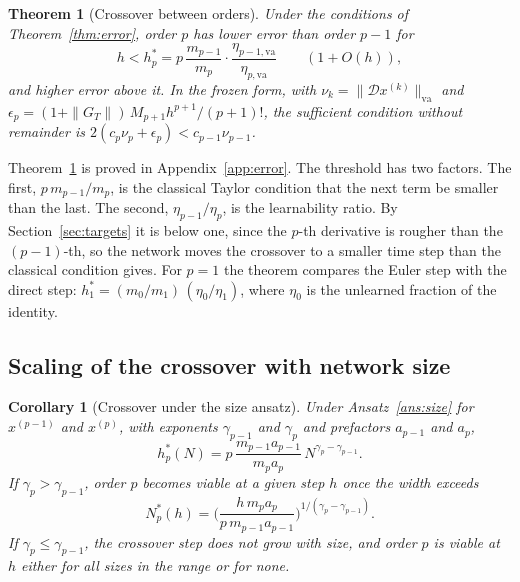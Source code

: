 \documentclass[11pt]{article}
\newtheorem{theorem}{Theorem}
\newtheorem{corollary}{Corollary}
\theoremstyle{definition}
\theoremstyle{remark}
\newcommand{\va}{\mathrm{va}}
\newcommand{\Dmap}{\mathcal{D}}
\begin{document}
\begin{theorem}[Crossover between orders]\label{thm:crossover}
Under the conditions of Theorem~\ref{thm:error}, order $p$ has lower error than order $p-1$ for
\begin{equation}\label{eq:hstar}
h < h_p^\ast = p\,\frac{m_{p-1}}{m_p}\cdot\frac{\eta_{p-1,\va}}{\eta_{p,\va}} \qquad (1 + O(h)),
\end{equation}
and higher error above it.
In the frozen form, with $\nu_k = \|\Dmap x^{(k)}\|_\va$ and $\epsilon_p = (1+\|G_T\|)\,M_{p+1}h^{p+1}/(p+1)!$, the sufficient condition without remainder is $2(c_p\nu_p + \epsilon_p) < c_{p-1}\nu_{p-1}$.
\end{theorem}

Theorem~\ref{thm:crossover} is proved in Appendix~\ref{app:error}.
The threshold has two factors.
The first, $p\,m_{p-1}/m_p$, is the classical Taylor condition that the next term be smaller than the last.
The second, $\eta_{p-1}/\eta_p$, is the learnability ratio.
By Section~\ref{sec:targets} it is below one, since the $p$-th derivative is rougher than the $(p-1)$-th, so the network moves the crossover to a smaller time step than the classical condition gives.
For $p = 1$ the theorem compares the Euler step with the direct step: $h_1^\ast = (m_0/m_1)\,(\eta_0/\eta_1)$, where $\eta_0$ is the unlearned fraction of the identity.

\subsection{Scaling of the crossover with network size}

\begin{corollary}[Crossover under the size ansatz]\label{cor:scaling}
Under Ansatz~\ref{ans:size} for $x^{(p-1)}$ and $x^{(p)}$, with exponents $\gamma_{p-1}$ and $\gamma_p$ and prefactors $a_{p-1}$ and $a_p$,
\begin{equation}\label{eq:hstar-N}
h_p^\ast(N) = p\,\frac{m_{p-1}a_{p-1}}{m_p a_p}\,N^{\gamma_p - \gamma_{p-1}} .
\end{equation}
If $\gamma_p > \gamma_{p-1}$, order $p$ becomes viable at a given step $h$ once the width exceeds
\begin{equation}\label{eq:Nstar}
N_p^\ast(h) = \Big(\frac{h\,m_p a_p}{p\,m_{p-1}a_{p-1}}\Big)^{1/(\gamma_p - \gamma_{p-1})} .
\end{equation}
If $\gamma_p \le \gamma_{p-1}$, the crossover step does not grow with size, and order $p$ is viable at $h$ either for all sizes in the range or for none.
\end{corollary}
\end{document}
